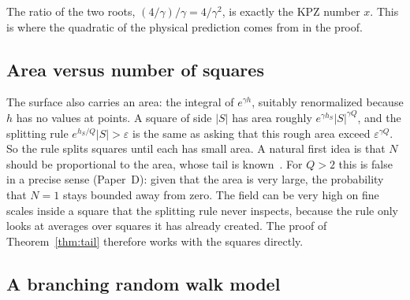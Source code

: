 The ratio of the two roots, $(4/\gamma)/\gamma=4/\gamma^2$, is exactly the KPZ number $x$. This
is where the quadratic of the physical prediction comes from in the proof.

\subsection{Area versus number of squares}\label{sec:area}

The surface also carries an area: the integral of $e^{\gamma h}$, suitably renormalized because
$h$ has no values at points. A square of side $|S|$ has area roughly $e^{\gamma h_S}|S|^{\gamma Q}$,
and the splitting rule $e^{h_S/Q}|S|>\varepsilon$ is the same as asking that this rough area
exceed $\varepsilon^{\gamma Q}$. So the rule splits squares until each has small area. A natural
first idea is that $N$ should be proportional to the area, whose tail is
known~\cite{RV,Wong}. For $Q>2$ this is false in a precise sense (Paper~D): given that the area is
very large, the probability that $N=1$ stays bounded away from zero. The field can be very high on
fine scales inside a square that the splitting rule never inspects, because the rule only looks
at averages over squares it has already created. The proof of Theorem~\ref{thm:tail} therefore
works with the squares directly.

\subsection{A branching random walk model}\label{sec:cascade}


